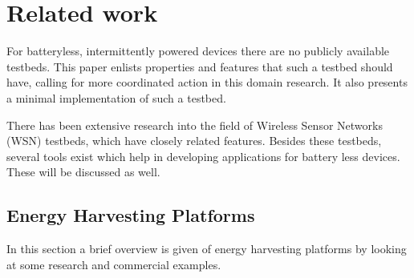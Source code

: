 \chapter{Related work}
\label{chp:related-work}


For batteryless, intermittently powered devices there are no publicly available testbeds. This paper \cite{request} enlists properties and features that such a testbed should have, calling for more coordinated action in this domain research. It also presents a minimal implementation of such a testbed.

There has been extensive research into the field of Wireless Sensor Networks (WSN) testbeds, which have closely related features. Besides these testbeds, several tools exist which help in developing applications for battery less devices. These will be discussed as well.

\section{Energy Harvesting Platforms}

In this section a brief overview is given of energy harvesting platforms by looking at some research and commercial examples.

